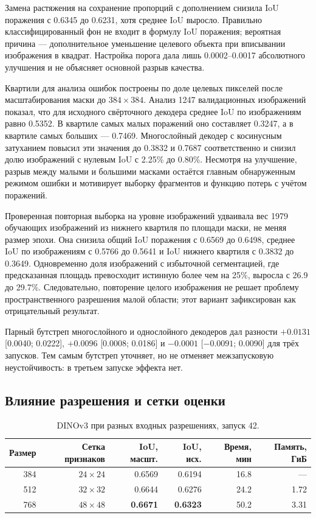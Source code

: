 \documentclass[a4paper,12pt]{extarticle}
\begin{document}
Замена растяжения на сохранение пропорций с дополнением снизила
IoU поражения с 0.6345 до 0.6231, хотя среднее IoU выросло. Правильно
классифицированный фон не входит в формулу IoU поражения; вероятная причина ---
дополнительное уменьшение целевого объекта при вписывании изображения в
квадрат. Настройка порога дала лишь 0.0002--0.0017
абсолютного улучшения и не объясняет основной разрыв качества.

Квартили для анализа ошибок построены по доле целевых пикселей после
масштабирования маски до $384\times384$. Анализ 1247 валидационных изображений
показал, что для исходного свёрточного
декодера среднее IoU по изображениям равно 0.5352. В квартиле самых малых поражений оно
составляет 0.3247, а в квартиле самых больших --- 0.7469. Многослойный декодер с
косинусным затуханием повысил эти значения до 0.3832 и 0.7687 соответственно и снизил
долю изображений с нулевым IoU с 2.25\% до 0.80\%. Несмотря на улучшение,
разрыв между малыми и большими масками остаётся главным обнаруженным режимом
ошибки и мотивирует выборку фрагментов и функцию потерь с учётом поражений.

Проверенная повторная выборка на уровне изображений удваивала вес 1979 обучающих
изображений из
нижнего квартиля по площади маски, не меняя размер эпохи. Она снизила общий IoU
поражения с 0.6569 до 0.6498, среднее IoU по изображениям с 0.5766 до 0.5641 и IoU
нижнего квартиля с 0.3832 до 0.3649. Одновременно доля изображений с избыточной
сегментацией, где предсказанная площадь превосходит истинную более чем на 25\%, выросла
с 26.9 до 29.7\%. Следовательно, повторение целого изображения не решает проблему
пространственного разрешения малой области; этот вариант зафиксирован как
отрицательный результат.

Парный бутстреп многослойного и однослойного декодеров дал разности
$+0.0131$ [0.0040; 0.0222], $+0.0096$ [0.0008; 0.0186] и $-0.0001$
[$-0.0091$; 0.0090] для трёх запусков. Тем самым бутстреп уточняет, но не
отменяет межзапусковую неустойчивость: в третьем запуске эффекта нет.

\subsection{Влияние разрешения и сетки оценки}

\begin{table}[ht]
  \caption{DINOv3 при разных входных разрешениях, запуск 42.}
  \label{tab:resolution}
  \centering
  \small
  \begin{tabular}{rrrrrr}
    \toprule
    Размер & Сетка признаков & IoU, масшт. & IoU, исх. & Время, мин & Память, ГиБ \\
    \midrule
    384 & $24\times24$ & 0.6569 & 0.6194 & 16.8 & --- \\
    512 & $32\times32$ & 0.6644 & 0.6276 & 24.2 & 1.72 \\
    768 & $48\times48$ & \textbf{0.6671} & \textbf{0.6323} & 50.2 & 3.31 \\
    \bottomrule
  \end{tabular}
\end{table}
\end{document}
